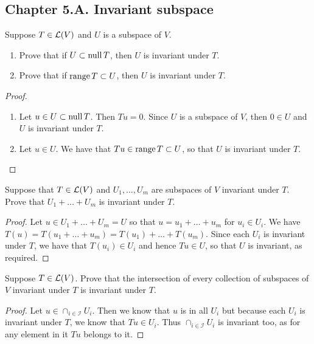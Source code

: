 \subsection*{Chapter 5.A. Invariant subspace}


\begin{exercise}{1}
  Suppose $T\in\mathcal{L}(V)$ and $U$ is a subspace of $V$.
  \begin{enumerate}
      \item Prove that if $U\subset\operatorname*{null} T$, then $U$ is invariant under $T$.
      \item Prove that if $\operatorname*{range} T\subset U$, then $U$ is invariant under $T$.
  \end{enumerate}
\end{exercise}
\begin{proof}
 \begin{enumerate}
     \item Let $u\in U\subset\operatorname*{null} T$. Then $Tu=0$. Since $U$ is a subspace of $V$, then $0\in U$ and $U$ is invariant under $T$.
     \item Let $u\in U$. We have that $Tu\in\operatorname*{range} T\subset U$, so that $U$ is invariant under $T$.
 \end{enumerate}
\end{proof}

\begin{exercise}{4}
  Suppose that $T\in\mathcal{L}(V)$ and $U_1,\dots,U_m$ are subspaces of $V$ invariant under $T$. Prove that $U_1+\dots+U_m$ is invariant under $T$.
\end{exercise}
\begin{proof}
 Let $u\in U_1+\dots+U_m=U$ so that $u=u_1+\dots+u_m$ for $u_i\in U_i$. We have $T(u)=T(u_1+\dots+u_m)=T(u_1)+\dots+T(u_m)$. Since each $U_i$ is invariant under $T$, we have that $T(u_i)\in U_i$ and hence $Tu\in U$, so that $U$ is invariant, as required.
\end{proof}

\begin{exercise}{5}
  Suppose $T\in\mathcal{L}(V)$. Prove that the intersection of every collection of subspaces of $V$ invariant under $T$ is invariant under $T$.
\end{exercise}
\begin{proof}
 Let $u\in\cap_{i\in\mathcal{I}}U_i$. Then we know that $u$ is in all $U_i$ but because each $U_i$ is invariant under $T$, we know that $Tu\in U_i$. Thus $\cap_{i\in\mathcal{I}}U_i$ is invariant too, as for any element in it $Tu$ belongs to it.
\end{proof}

